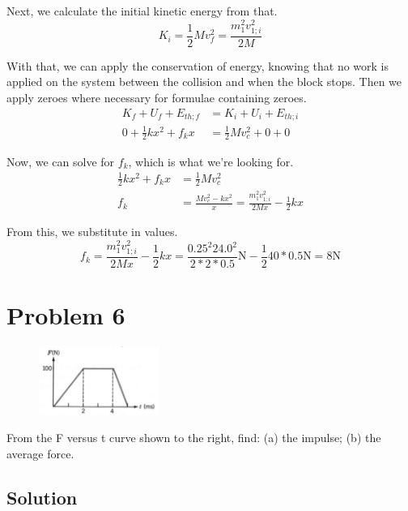 \documentclass[12pt]{article}
\begin{document}
Next, we calculate the initial kinetic energy from that. 
\begin{equation*}
    K_i =   \frac{1}{2}Mv_f^2
        =   \frac{m_1^2 v_{1;i}^2}{2M}
\end{equation*}

With that, we can apply the conservation of energy, knowing that no work is applied on the system between the collision and when the block stops. Then we apply zeroes where necessary for formulae containing zeroes.
\begin{align*}
    K_f + U_f   + E_{th;f}    &=  K_i + U_i + E_{th;i}\\
    0   + \frac{1}{2}kx^2   +   f_k x   &=  \frac{1}{2}Mv_c^2 + 0 + 0
\end{align*}

Now, we can solve for $f_k$, which is what we're looking for.
\begin{align*}
    \frac{1}{2}kx^2   +   f_k x   &=  \frac{1}{2}Mv_c^2\\
    f_k &=  \frac{Mv_c^2 - kx^2}{x}
        =   \frac{m_1^2 v_{1;i}^2}{2Mx} - \frac{1}{2}kx
\end{align*}

From this, we substitute in values.
\[ f_k = \frac{m_1^2 v_{1;i}^2}{2Mx} - \frac{1}{2}kx = \frac{0.25^2 24.0^2}{2*2*0.5}\unit{\newton} - \frac{1}{2}40*0.5 \unit{\newton} = \boxed{8\unit{\newton}} \]


\pagebreak
\section*{Problem 6}
\begin{figure}
    \vspace{-58pt}
    \includegraphics[width=0.35\textwidth]{graph_6.png} 
\end{figure}
From the F versus t curve shown to the right, find: (a) the impulse; (b) the average force.

\subsection*{Solution}
\end{document}
